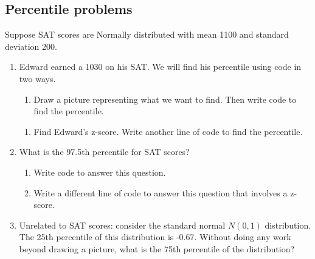 \documentclass[
  letterpaper,
  DIV=11,
  numbers=noendperiod]{scrartcl}
\providecommand{\tightlist}{%
  \setlength{\itemsep}{0pt}\setlength{\parskip}{0pt}}
\begin{document}
\subsection{Percentile problems}\label{percentile-problems}

Suppose SAT scores are Normally distributed with mean 1100 and standard
deviation 200.

\begin{enumerate}
\def\labelenumi{\arabic{enumi}.}
\item
  Edward earned a 1030 on his SAT. We will find his percentile using
  code in two ways.

  \begin{enumerate}
  \def\labelenumii{\alph{enumii}.}
  \tightlist
  \item
    Draw a picture representing what we want to find. Then write code to
    find the percentile.
  \end{enumerate}

  \vspace{3cm}

  \begin{enumerate}
  \def\labelenumii{\alph{enumii}.}
  \setcounter{enumii}{1}
  \item
    Find Edward's z-score. Write another line of code to find the
    percentile.

    \vspace{3cm}
  \end{enumerate}
\item
  What is the 97.5th percentile for SAT scores?

  \begin{enumerate}
  \def\labelenumii{\alph{enumii}.}
  \item
    Write code to answer this question.

    \vspace{2cm}
  \item
    Write a different line of code to answer this question that involves
    a z-score.

    \vspace{3cm}
  \end{enumerate}
\item
  Unrelated to SAT scores: consider the standard normal \(N(0,1)\)
  distribution. The 25th percentile of this distribution is -0.67.
  Without doing any work beyond drawing a picture, what is the 75th
  percentile of the distribution?

  \vspace{3cm}
\end{enumerate}
\end{document}
